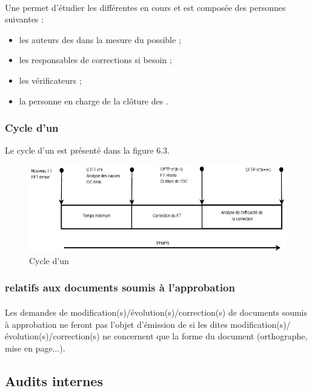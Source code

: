 \paragraph*{} Une \CTFTCourt{} permet d'étudier les différentes \FTCourt{} en cours et est composée des personnes
suivantes :
\begin{itemize}
\item les auteurs des \FFTCourt{} dans la mesure du possible ;
\item les responsables de corrections si besoin ;
\item les vérificateurs ;
\item la personne en charge de la clôture des \OCCourt .
\end{itemize}

\subsubsection*{Cycle d'un \FTCourt}
Le cycle d'un \FTCourt{} est présenté dans la figure 6.3.

\begin{figure}[h]
   \center
   \caption{\label{Figure 6.1} Cycle d'un \FT}
   \includegraphics[width=13cm]{./images/cycle_d_un_fait_technique.jpg}
\end{figure}

\subsubsection*{\FTCourt{} relatifs aux documents soumis à l’approbation}
\paragraph*{} Les demandes de modification(s)/évolution(s)/correction(s) de documents soumis à approbation ne feront pas l'objet d'émission de \FTCourt{} si les dites modification(s)/évolution(s)/correction(s) ne concernent que la forme du document (orthographe, mise en page...).

\subsection{Audits internes}
